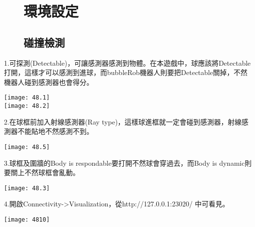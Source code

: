 \newpage
\begin{figure}[hbt!]
\chapter{環境設定}
\section{碰撞檢測}
\end{figure}
1.可探測(Detectable)，可讓感測器感測到物體。在本遊戲中，球應該將Detectable打開，這樣才可以感測到進球，而bubbleRob機器人則要把Detectable關掉，不然機器人碰到感測器也會得分。\
\begin{center}
\texttt{[image: 48.1]}\\
\texttt{[image: 48.2]}
\end{center}
\newpage
2.在球框前加入射線感測器(Ray type)，這樣球進框就一定會碰到感測器，射線感測器不能貼地不然感測不到。
\begin{center}
\texttt{[image: 48.5]}
\end{center}

3.球框及圍牆的Body is respondable要打開不然球會穿過去，而Body is dynamic則要關上不然球框會亂動。
\begin{center}
\texttt{[image: 48.3]}
\end{center}

4.開啟Connectivity->Visualization，從http://127.0.0.1:23020/ 中可看見。
\begin{center}
\texttt{[image: 4810]}
\end{center}